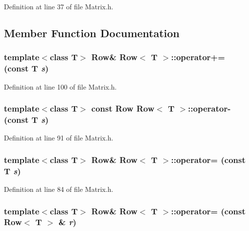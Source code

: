 Definition at line 37 of file Matrix.h.



\subsection{Member Function Documentation}
\hypertarget{classRow_a46ffce8561e1869e2a4d3a7ac107469b}{
\subsubsection[{operator+=}]{\setlength{\rightskip}{0pt plus 5cm}template$<$class T$>$ {\bf Row}\& {\bf Row}$<$ T $>$::operator+= (const T {\em s})}}
\label{classRow_a46ffce8561e1869e2a4d3a7ac107469b}


Definition at line 100 of file Matrix.h.

\hypertarget{classRow_a0f6c09f74d0ab002c9af9ad0dfd89399}{
\subsubsection[{operator-\/}]{\setlength{\rightskip}{0pt plus 5cm}template$<$class T$>$ const {\bf Row} {\bf Row}$<$ T $>$::operator-\/ (const T {\em s})}}
\label{classRow_a0f6c09f74d0ab002c9af9ad0dfd89399}


Definition at line 91 of file Matrix.h.

\hypertarget{classRow_a1511d921c037da716d3ca7b6da79ab94}{
\subsubsection[{operator=}]{\setlength{\rightskip}{0pt plus 5cm}template$<$class T$>$ {\bf Row}\& {\bf Row}$<$ T $>$::operator= (const T {\em s})}}
\label{classRow_a1511d921c037da716d3ca7b6da79ab94}


Definition at line 84 of file Matrix.h.

\hypertarget{classRow_a877484e061eef2a179cc28d30b3ec542}{
\subsubsection[{operator=}]{\setlength{\rightskip}{0pt plus 5cm}template$<$class T$>$ {\bf Row}\& {\bf Row}$<$ T $>$::operator= (const {\bf Row}$<$ T $>$ \& {\em r})}}
\label{classRow_a877484e061eef2a179cc28d30b3ec542}


